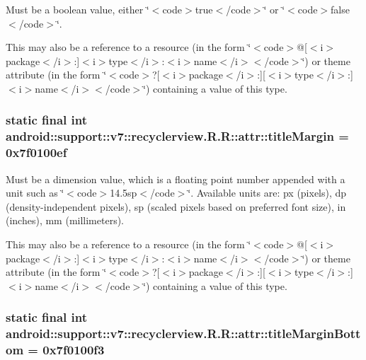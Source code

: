 Must be a boolean value, either \char`\"{}$<$code$>$true$<$/code$>$\char`\"{} or \char`\"{}$<$code$>$false$<$/code$>$\char`\"{}. 

This may also be a reference to a resource (in the form \char`\"{}$<$code$>$@\mbox{[}$<$i$>$package$<$/i$>$:\mbox{]}$<$i$>$type$<$/i$>$:$<$i$>$name$<$/i$>$$<$/code$>$\char`\"{}) or theme attribute (in the form \char`\"{}$<$code$>$?\mbox{[}$<$i$>$package$<$/i$>$:\mbox{]}\mbox{[}$<$i$>$type$<$/i$>$:\mbox{]}$<$i$>$name$<$/i$>$$<$/code$>$\char`\"{}) containing a value of this type. \hypertarget{classandroid_1_1support_1_1v7_1_1recyclerview_1_1_r_1_1attr_9beb8905f6b42d8a958f221ed5a81cca}{
\subsubsection[{titleMargin}]{\setlength{\rightskip}{0pt plus 5cm}static final int android::support::v7::recyclerview.R.R::attr::titleMargin = 0x7f0100ef}}
\label{classandroid_1_1support_1_1v7_1_1recyclerview_1_1_r_1_1attr_9beb8905f6b42d8a958f221ed5a81cca}


Must be a dimension value, which is a floating point number appended with a unit such as \char`\"{}$<$code$>$14.5sp$<$/code$>$\char`\"{}. Available units are: px (pixels), dp (density-independent pixels), sp (scaled pixels based on preferred font size), in (inches), mm (millimeters). 

This may also be a reference to a resource (in the form \char`\"{}$<$code$>$@\mbox{[}$<$i$>$package$<$/i$>$:\mbox{]}$<$i$>$type$<$/i$>$:$<$i$>$name$<$/i$>$$<$/code$>$\char`\"{}) or theme attribute (in the form \char`\"{}$<$code$>$?\mbox{[}$<$i$>$package$<$/i$>$:\mbox{]}\mbox{[}$<$i$>$type$<$/i$>$:\mbox{]}$<$i$>$name$<$/i$>$$<$/code$>$\char`\"{}) containing a value of this type. \hypertarget{classandroid_1_1support_1_1v7_1_1recyclerview_1_1_r_1_1attr_eeef1af49a9f1471a5640d12cc8cb81e}{
\subsubsection[{titleMarginBottom}]{\setlength{\rightskip}{0pt plus 5cm}static final int android::support::v7::recyclerview.R.R::attr::titleMarginBottom = 0x7f0100f3}}
\label{classandroid_1_1support_1_1v7_1_1recyclerview_1_1_r_1_1attr_eeef1af49a9f1471a5640d12cc8cb81e}


